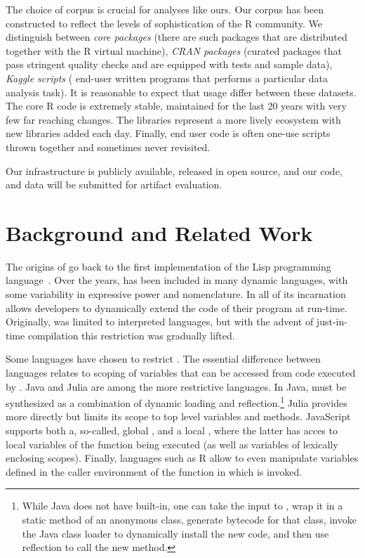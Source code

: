 \documentclass[USenglish,cleveref, autoref, thm-restate]{lipics-v2019}
\begin{document}
The choice of corpus is crucial for analyses like ours.  Our corpus
has been constructed to reflect the levels of sophistication of the R
community.  We distinguish between \emph{core packages} (there are
\CorpusCorePackages such packages that are distributed together with
the R virtual machine), \emph{CRAN packages} (\CorpusPackages curated
packages that pass stringent quality checks and are equipped with
tests and sample data), \emph{Kaggle scripts} (\CorpusFinishedKaggle
end-user written programs that performs a particular data analysis
task). It is reasonable to expect that \eval usage differ between
these datasets. The core R code is extremely stable, maintained for
the last 20 years with very few far reaching changes. The libraries
represent a more lively ecosystem with new libraries added each day.
Finally, end user code is often one-use scripts thrown together and
sometimes never revisited.


Our infrastructure is publicly available, released in open source, and
our code, and data will be submitted for artifact evaluation.


\section{Background and Related Work}

The origins of \eval go back to the first implementation of the Lisp
programming language~\cite{lisp}. Over the years, \eval has been included in
many dynamic languages, with some variability in expressive power and
nomenclature. In all of its incarnation \eval allows developers to
dynamically extend the code of their program at run-time.  Originally, \eval
was limited to interpreted languages, but with the advent of just-in-time
compilation this restriction was gradually lifted.

Some languages have chosen to restrict \eval. The essential difference
between languages relates to scoping of variables that can be accessed from
code executed by \eval.  Java and Julia are among the more restrictive
languages. In Java, \eval must be synthesized as a combination of dynamic
loading and reflection.\footnote{While Java does not have \eval built-in,
  one can take the input to \eval, wrap it in a static method of an
  anonymous class, generate bytecode for that class, invoke the Java class
  loader to dynamically install the new code, and then use reflection to
  call the new method.} Julia provides \eval more directly but limits its
scope to top level variables and methods. JavaScript supports both a,
so-called, global \eval, and a local \eval, where the latter has acces to
local variables of the function being executed (as well as variables of
lexically enclosing scopes). Finally, languages such as R allow \eval to
even manipulate variables defined in the caller environment of the function in
which \eval is invoked.
\end{document}
